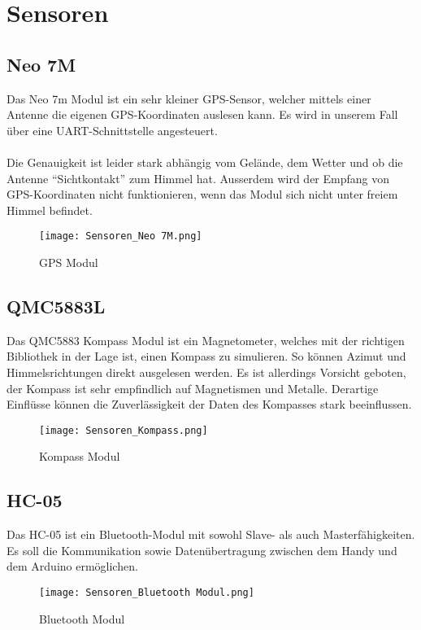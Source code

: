 \section{Sensoren}

\subsection{Neo 7M}
Das Neo 7m Modul ist ein sehr kleiner GPS-Sensor, welcher mittels einer Antenne die eigenen GPS-Koordinaten auslesen kann. Es wird in unserem Fall über eine UART-Schnittstelle angesteuert.\\
\\
Die Genauigkeit ist leider stark abhängig vom Gelände, dem Wetter und ob die Antenne “Sichtkontakt” zum Himmel hat. Ausserdem wird der Empfang von GPS-Koordinaten nicht funktionieren, wenn das Modul sich nicht unter freiem Himmel befindet.

\begin{figure}[H]
    \begin{center}
    \texttt{[image: Sensoren\_Neo 7M.png]}
    \end{center}
    \caption{GPS Modul}
\end{figure}

\subsection{QMC5883L}
Das QMC5883 Kompass Modul ist ein Magnetometer, welches mit der richtigen Bibliothek in der Lage ist, einen Kompass zu simulieren. So können Azimut und Himmelsrichtungen direkt ausgelesen werden. Es ist allerdings Vorsicht geboten, der Kompass ist sehr empfindlich auf Magnetismen und Metalle. Derartige Einflüsse können die Zuverlässigkeit der Daten des Kompasses stark beeinflussen.

\begin{figure}[H]
    \begin{center}
    \texttt{[image: Sensoren\_Kompass.png]}
    \end{center}
    \caption{Kompass Modul}
\end{figure}

\pagebreak

\subsection{HC-05}
Das HC-05 ist ein Bluetooth-Modul mit sowohl Slave- als auch Masterfähigkeiten. Es soll die Kommunikation sowie Datenübertragung zwischen dem Handy und dem Arduino ermöglichen. 

\begin{figure}[H]
    \begin{center}
    \texttt{[image: Sensoren\_Bluetooth Modul.png]}
    \end{center}
    \caption{Bluetooth Modul}
\end{figure}

